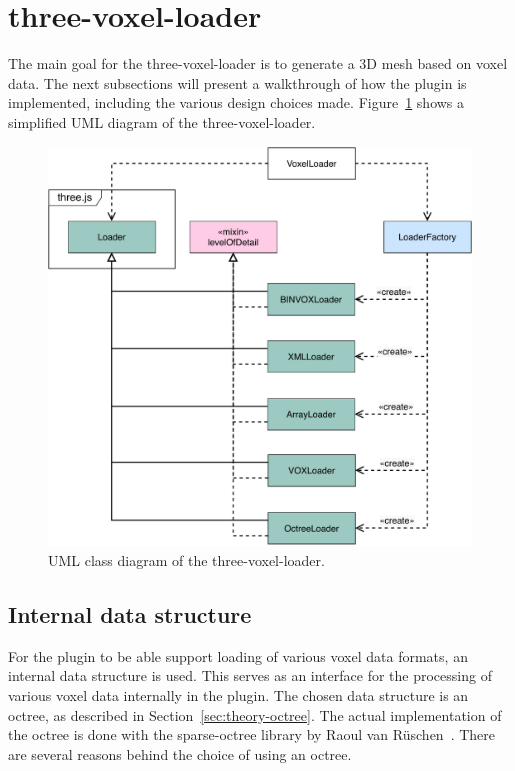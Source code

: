 \section{three-voxel-loader}
The main goal for the three-voxel-loader is to generate a 3D mesh based on voxel data. The next subsections will present a walkthrough of how the plugin is implemented, including the various design choices made. Figure~\ref{fig:uml-three-voxel-loader} shows a simplified UML diagram of the three-voxel-loader.
\begin{figure}[ht]
    \centering
    \includegraphics[scale=0.75]{sections/methodology/figures/uml/uml-three-voxel-loader.pdf}
    \caption{UML class diagram of the three-voxel-loader.}
    \label{fig:uml-three-voxel-loader}
\end{figure}

\subsection{Internal data structure}
\label{sec:method-internal-data-structure}
For the plugin to be able support loading of various voxel data formats, an internal data structure is used. This serves as an interface for the processing of various voxel data internally in the plugin. The chosen data structure is an octree, as described in Section~\ref{sec:theory-octree}. The actual implementation of the octree is done with the sparse-octree library by Raoul van R\"uschen~\cite{sparse-octree}. There are several reasons behind the choice of using an octree. 

